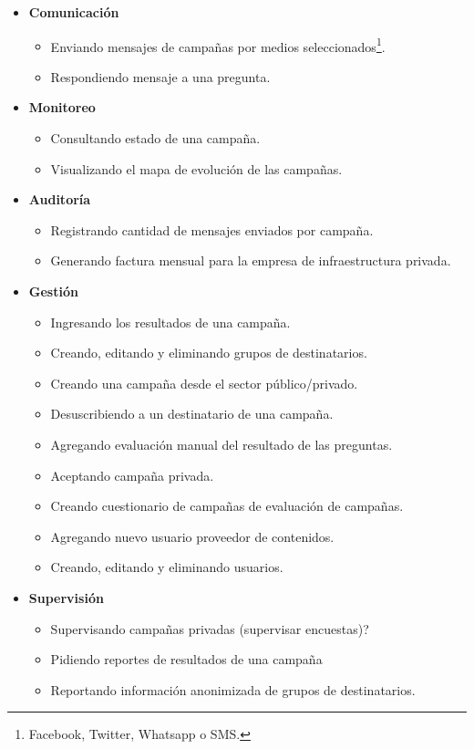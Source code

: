 \documentclass[a4paper, 10pt, twoside]{article}
\begin{document}
\begin{itemize}

\item \textbf{Comunicación}
\begin{itemize}
\item Enviando mensajes de campañas por medios seleccionados\footnote{Facebook, Twitter, Whatsapp o SMS.}.
\item Respondiendo mensaje a una pregunta.
\end{itemize}

\item \textbf{Monitoreo}
\begin{itemize}
\item Consultando estado de una campaña.
\item Visualizando el mapa de evolución de las campañas.
\end{itemize}

\item \textbf{Auditoría}
\begin{itemize}
\item Registrando cantidad de mensajes enviados por campaña.
\item Generando factura mensual para la empresa de infraestructura privada.
\end{itemize}

\item \textbf{Gestión}
\begin{itemize}
\item Ingresando los resultados de una campaña.
\item Creando, editando y eliminando grupos de destinatarios.
\item Creando una campaña desde el sector público/privado.
\item Desuscribiendo a un destinatario de una campaña.
\item Agregando evaluación manual del resultado de las preguntas.
\item Aceptando campaña privada.
\item Creando cuestionario de campañas de evaluación de campañas.
\item Agregando nuevo usuario proveedor de contenidos.
\item Creando, editando y eliminando usuarios.
\end{itemize}

\item \textbf{Supervisión}
\begin{itemize}
\item Supervisando campañas privadas (supervisar encuestas)?
\item Pidiendo reportes de resultados de una campaña
\item Reportando información anonimizada de grupos de destinatarios.
\end{itemize}


\end{itemize}
\end{document}
